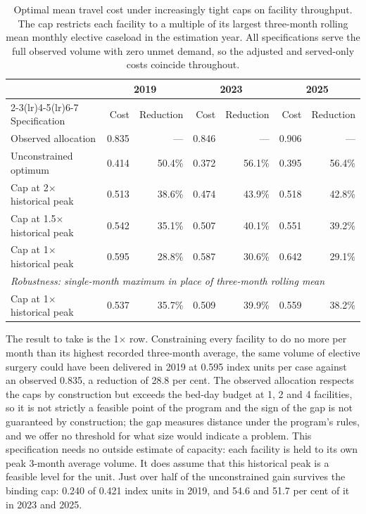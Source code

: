 \begin{table}[t]
\centering
\caption{Optimal mean travel cost under increasingly tight caps on facility
throughput. The cap restricts each facility to a multiple of its largest
three-month rolling mean monthly elective caseload in the estimation year. All
specifications serve the full observed volume with zero unmet demand, so the
adjusted and served-only costs coincide throughout.}
\label{tab:modelrobust}
\begin{tabular}{lrrrrrr}
\toprule
& \multicolumn{2}{c}{2019} & \multicolumn{2}{c}{2023} & \multicolumn{2}{c}{2025} \\
\cmidrule(lr){2-3}\cmidrule(lr){4-5}\cmidrule(lr){6-7}
Specification & Cost & Reduction & Cost & Reduction & Cost & Reduction \\
\midrule
Observed allocation & 0.835 & --- & 0.846 & --- & 0.906 & --- \\
Unconstrained optimum & 0.414 & 50.4\% & 0.372 & 56.1\% & 0.395 & 56.4\% \\
Cap at 2$\times$ historical peak & 0.513 & 38.6\% & 0.474 & 43.9\% & 0.518 & 42.8\% \\
Cap at 1.5$\times$ historical peak & 0.542 & 35.1\% & 0.507 & 40.1\% & 0.551 & 39.2\% \\
Cap at 1$\times$ historical peak & 0.595 & 28.8\% & 0.587 & 30.6\% & 0.642 & 29.1\% \\
\midrule
\multicolumn{7}{l}{\emph{Robustness: single-month maximum in place of three-month rolling mean}} \\
Cap at 1$\times$ historical peak & 0.537 & 35.7\% & 0.509 & 39.9\% & 0.559 & 38.2\% \\
\bottomrule
\end{tabular}
\end{table}

The result to take is the 1$\times$ row. Constraining every facility to do no more per month than its highest recorded three-month average, the
same volume of elective surgery could have been delivered in 2019 at 0.595
index units per case against an observed 0.835, a reduction of 28.8 per cent. The observed allocation respects the caps by construction but exceeds the bed-day budget at 1, 2 and 4 facilities, so it is not strictly a feasible point of the program and the sign of the gap is not guaranteed by construction; the gap measures distance under the program's rules, and we offer no threshold for what size would indicate a problem. This specification needs no outside estimate of capacity: each facility is held to its own
peak 3-month average volume. It does assume that this historical peak is a feasible level for the unit. Just over half of the
unconstrained gain survives the binding cap: 0.240 of 0.421 index units in
2019, and 54.6 and 51.7 per cent of it in 2023 and 2025.


